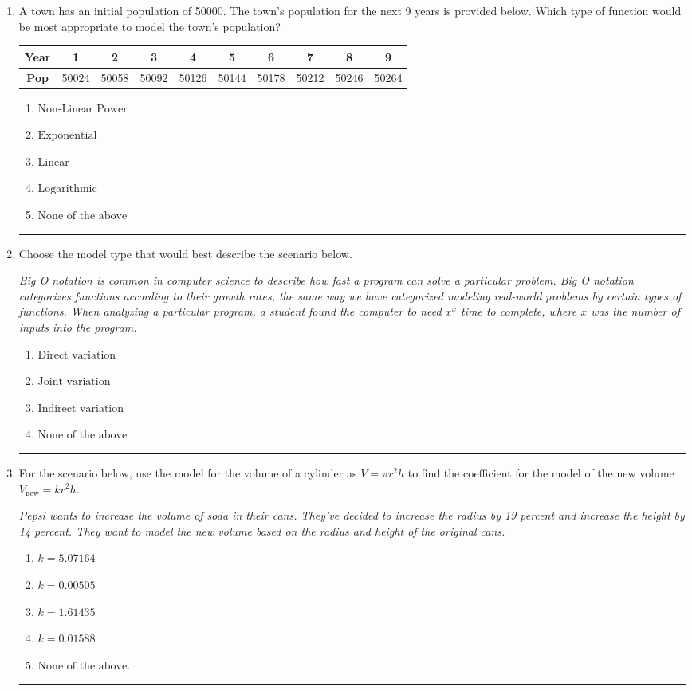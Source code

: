 \documentclass[14pt]{extbook}
\newcommand{\litem}[1]{\item#1\hspace*{-1cm}\rule{\textwidth}{0.4pt}}
\begin{document}
\begin{enumerate}
\litem{
A town has an initial population of 50000. The town's population for the next 9 years is provided below. Which type of function would be most appropriate to model the town's population?

\begin{tabular}{c|c|c|c|c|c|c|c|c|c}
\textbf{Year} &1 &2 &3 &4 &5 &6 &7 &8 &9\tabularnewline \hline
\textbf{Pop} &50024 &50058 &50092 &50126 &50144 &50178 &50212 &50246 &50264\end{tabular}\begin{enumerate}[label=\Alph*.]
\item \( \text{Non-Linear Power} \)
\item \( \text{Exponential} \)
\item \( \text{Linear} \)
\item \( \text{Logarithmic} \)
\item \( \text{None of the above} \)

\end{enumerate} }
\litem{
Choose the model type that would best describe the scenario below.
\begin{center}
    \textit{ Big O notation is common in computer science to describe how fast a program can solve a particular problem. Big O notation categorizes functions according to their growth rates, the same way we have categorized modeling real-world problems by certain types of functions. When analyzing a particular program, a student found the computer to need $x^x$ time to complete, where $x$ was the number of inputs into the program. }
\end{center}
\begin{enumerate}[label=\Alph*.]
\item \( \text{Direct variation} \)
\item \( \text{Joint variation} \)
\item \( \text{Indirect variation} \)
\item \( \text{None of the above} \)

\end{enumerate} }
\litem{
For the scenario below, use the model for the volume of a cylinder as $V = \pi r^2 h$ to find the coefficient for the model of the new volume $V_{\text{new}} = k r^2 h$.
\begin{center}
    \textit{ Pepsi wants to increase the volume of soda in their cans. They've decided to increase the radius by 19 percent and increase the height by 14 percent. They want to model the new volume based on the radius and height of the original cans. }
\end{center}
\begin{enumerate}[label=\Alph*.]
\item \( k = 5.07164 \)
\item \( k = 0.00505 \)
\item \( k = 1.61435 \)
\item \( k = 0.01588 \)
\item \( \text{None of the above.} \)


\end{enumerate}}
\end{enumerate}
\end{document}
